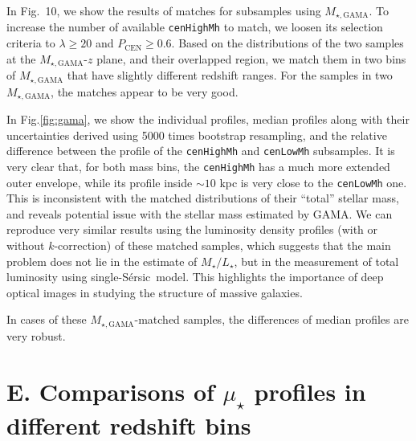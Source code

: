 \documentclass{emulateapj}
\def\ser{{S\'{e}rsic\ }}
\def\rbcg{\texttt{cenHighMh}}
\def\nbcg{\texttt{cenLowMh}}
\def\m2l{{$M_{\star}/L_{\star}$}}
\def\mden{{$\mu_{\star}$}}
\begin{document}
\begin{CJK*}{UTF8}{gbsn}
    
    In Fig.~10, we show the results of matches for subsamples using 
    $M_{\star, \mathrm{GAMA}}$.  
    To increase the number of available \rbcg{} to match, we loosen 
    its selection criteria to $\lambda \ge 20$ and $P_{\mathrm{CEN}} \ge 0.6$.
    Based on the distributions of the two samples at the $M_{\star, \mathrm{GAMA}}$-$z$ 
    plane, and their overlapped region, we match them in two bins of 
    $M_{\star, \mathrm{GAMA}}$ that have slightly different redshift ranges. 
    For the samples in two $M_{\star, \mathrm{GAMA}}$, the matches appear to be
    very good.  
    
    In Fig.\ref{fig:gama}, we show the individual profiles, median profiles along with their 
    uncertainties derived using 5000 times bootstrap resampling, and the relative 
    difference between the profile of the \rbcg{} and \nbcg{} 
    subsamples.  
    It is very clear that, for both mass bins, the \rbcg{} has a much 
    more extended outer envelope, while its profile inside $\sim 10$ kpc is 
    very close to the \nbcg{} one.  
    This is inconsistent with the matched distributions of their ``total'' 
    stellar mass, and reveals potential issue with the stellar mass estimated 
    by GAMA.
    We can reproduce very similar results using the luminosity density profiles 
    (with or without $k$-correction) of these matched samples, which suggests 
    that the main problem does not lie in the estimate of \m2l{}, but in the 
    measurement of total luminosity using single-\ser model.  
    This highlights the importance of deep optical images in studying the 
    structure of massive galaxies. 
    
        In cases of these $M_{\star, \mathrm{GAMA}}$-matched samples, the differences
    of median profiles are very robust. 


\section{E. Comparisons of \mden{} profiles in different redshift bins}
    \label{app:D}


\end{CJK*}
\end{document}

